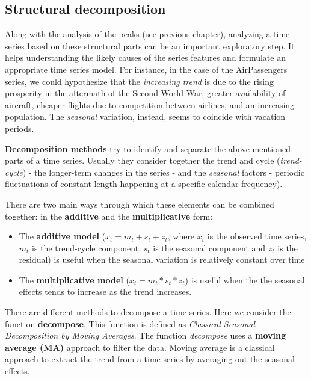 \documentclass[
]{article}
\providecommand{\tightlist}{%
  \setlength{\itemsep}{0pt}\setlength{\parskip}{0pt}}
\begin{document}
\subsection{Structural decomposition}\label{structural-decomposition-1}

Along with the analysis of the peaks (see previous chapter), analyzing a time series based on these structural parts can be an important exploratory step. It helps understanding the likely causes of the series features and formulate an appropriate time series model. For instance, in the case of the AirPassengers series, we could hypothesize that the \emph{increasing trend} is due to the rising prosperity in the aftermath of the Second World War, greater availability of aircraft, cheaper flights due to competition between airlines, and an increasing population. The \emph{seasonal} variation, instead, seems to coincide with vacation periods.

\textbf{Decomposition methods} try to identify and separate the above mentioned parts of a time series. Usually they consider together the trend and cycle (\emph{trend-cycle}) - the longer-term changes in the series - and the \emph{seasonal} factors - periodic fluctuations of constant length happening at a specific calendar frequency).

There are two main ways through which these elements can be combined together: in the \textbf{additive} and the \textbf{multiplicative} form:

\begin{itemize}
\tightlist
\item
  The \textbf{additive model} (\(x_{t} = m_{t} + s_{t} + z_{t}\), where \(x_{t}\) is the observed time series, \(m_{t}\) is the trend-cycle component, \(s_{t}\) is the seasonal component and \(z_{t}\) is the residual) is useful when the seasonal variation is relatively constant over time
\item
  The \textbf{multiplicative model} (\(x_{t} = m_{t} * s_{t} * z_{t}\)) is useful when the the seasonal effects tends to increase as the trend increases.
\end{itemize}

There are different methods to decompose a time series. Here we consider the function \textbf{decompose}. This function is defined as \emph{Classical Seasonal Decomposition by Moving Averages}. The function \emph{decompose} uses a \textbf{moving average (MA)} approach to filter the data. Moving average is a classical approach to extract the trend from a time series by averaging out the seasonal effects.
\end{document}
